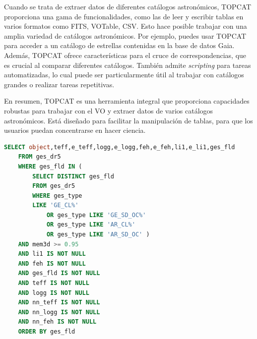 Cuando se trata de extraer datos de diferentes catálogos astronómicos, TOPCAT proporciona una gama de funcionalidades, como las de leer y escribir tablas en varios formatos como FITS, VOTable, CSV. Esto hace posible trabajar con una amplia variedad de catálogos astronómicos. Por ejemplo, puedes usar TOPCAT para acceder a un catálogo de estrellas contenidas en la base de datos Gaia. Además, TOPCAT ofrece características para el cruce de correspondencias, que es crucial al comparar diferentes catálogos. También admite \textit{scripting} para tareas automatizadas, lo cual puede ser particularmente útil al trabajar con catálogos grandes o realizar tareas repetitivas.\par

En resumen, TOPCAT es una herramienta integral que proporciona capacidades robustas para trabajar con el VO y extraer datos de varios catálogos astronómicos. Está diseñado para facilitar la manipulación de tablas, para que los usuarios puedan concentrarse en hacer ciencia.\par


\begin{lstlisting}[language=SQL, caption={Consulta TOPCAT sobre el catálogo GES DR5 para obtener los componentes de los cúmulos abiertos para los cuales se ha determinado una pertenecia mínima del 0.95\%. Las columnas obtenidas informan sobre la identificador de la estrella, $\teff$, $\gsurf$, $\feh$, A(Li) y sus errores asociados, y el identificador del cúmulo al que pertenece.}, label={lst:consulta}]
	SELECT object,teff,e_teff,logg,e_logg,feh,e_feh,li1,e_li1,ges_fld
	FROM ges_dr5 
	WHERE ges_fld IN (
		SELECT DISTINCT ges_fld
		FROM ges_dr5 
		WHERE ges_type 
		LIKE 'GE_CL%' 
			OR ges_type LIKE 'GE_SD_OC%' 
			OR ges_type LIKE 'AR_CL%' 
			OR ges_type LIKE 'AR_SD_OC' )
	AND mem3d >= 0.95
	AND li1 IS NOT NULL
	AND feh IS NOT NULL
	AND ges_fld IS NOT NULL
	AND teff IS NOT NULL
	AND logg IS NOT NULL
	AND nn_teff IS NOT NULL
	AND nn_logg IS NOT NULL
	AND nn_feh IS NOT NULL
	ORDER BY ges_fld
\end{lstlisting}





